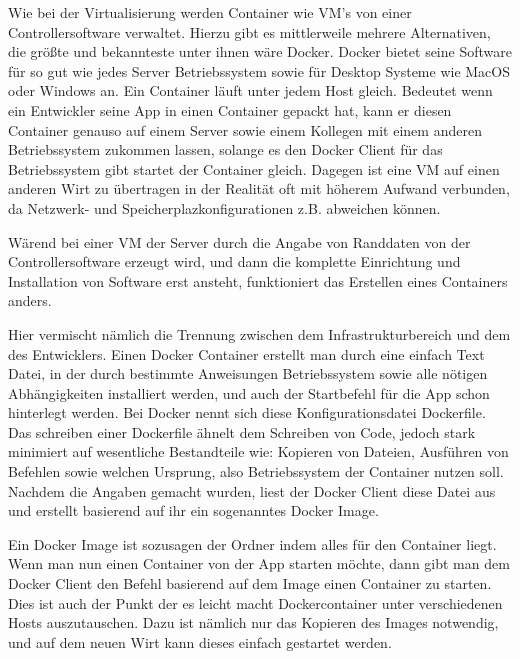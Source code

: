 Wie bei der Virtualisierung werden Container wie VM's von einer Controllersoftware verwaltet. Hierzu gibt es mittlerweile mehrere Alternativen, die größte und bekannteste unter ihnen wäre Docker.
Docker bietet seine Software für so gut wie jedes Server Betriebssystem sowie für Desktop Systeme wie MacOS oder Windows an. Ein Container läuft unter jedem Host gleich.
Bedeutet wenn ein Entwickler seine App in einen Container gepackt hat, kann er diesen Container genauso auf einem Server sowie einem Kollegen mit einem anderen Betriebssystem zukommen lassen, 
solange es den Docker Client für das Betriebssystem gibt startet der Container gleich.
Dagegen ist eine VM auf einen anderen Wirt zu übertragen in der Realität oft mit höherem Aufwand verbunden, da Netzwerk- und Speicherplazkonfigurationen z.B. abweichen können.

Wärend bei einer VM der Server durch die Angabe von Randdaten von der Controllersoftware erzeugt wird, und dann die komplette Einrichtung und Installation von Software erst ansteht, 
funktioniert das Erstellen eines Containers anders.

Hier vermischt nämlich die Trennung zwischen dem Infrastrukturbereich und dem des Entwicklers. Einen Docker Container erstellt man durch eine einfach Text Datei, in der durch 
bestimmte Anweisungen Betriebssystem sowie alle nötigen Abhängigkeiten installiert werden, und auch der Startbefehl für die App schon hinterlegt werden. 
Bei Docker nennt sich diese Konfigurationsdatei Dockerfile. Das schreiben einer Dockerfile ähnelt dem Schreiben von Code, jedoch stark minimiert auf wesentliche Bestandteile wie: Kopieren von Dateien, Ausführen von Befehlen sowie welchen Ursprung, also Betriebssystem der Container nutzen soll.
Nachdem die Angaben gemacht wurden, liest der Docker Client diese Datei aus und erstellt basierend auf ihr ein sogenanntes Docker Image.

Ein Docker Image ist sozusagen der Ordner indem alles für den Container liegt. Wenn man nun einen Container von der App starten möchte, dann gibt man dem Docker Client den Befehl basierend auf dem Image einen Container zu starten.
Dies ist auch der Punkt der es leicht macht Dockercontainer unter verschiedenen Hosts auszutauschen. Dazu ist nämlich nur das Kopieren des Images notwendig, und auf dem neuen Wirt kann dieses einfach gestartet werden.

